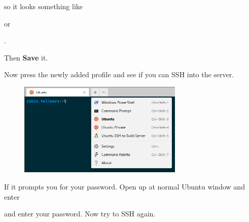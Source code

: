 
so it looks something like 


or

.

Then \textbf{Save} it.

Now press the newly added profile and see if you can SSH into the server.

\begin{figure}[H]
    \includegraphics[width=0.7\textwidth]{figures/profiles_dropdown.PNG}
\end{figure}

If it prompts you for your password. Open up at normal Ubuntu window and enter


and enter your password. Now try to SSH again.

